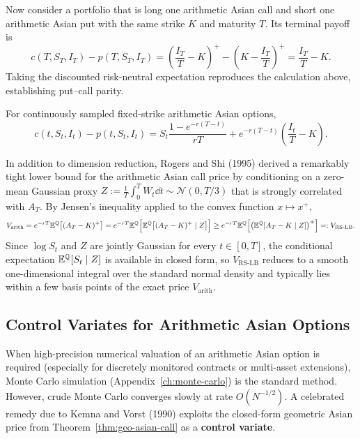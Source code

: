Now consider a portfolio that is long one arithmetic Asian call and short one arithmetic Asian put with the same strike $K$ and maturity $T$. Its terminal payoff is
\[
c(T, S_T, I_T) - p(T, S_T, I_T) = \left(\frac{I_T}{T} - K\right)^+ - \left(K - \frac{I_T}{T}\right)^+ = \frac{I_T}{T} - K.
\]
Taking the discounted risk-neutral expectation reproduces the calculation above, establishing put--call parity.

\begin{theorem}\label{thm:asian-put-call-parity}
    For continuously sampled fixed-strike arithmetic Asian options,
    \[
    c(t, S_t, I_t) - p(t, S_t, I_t) = S_t\frac{1 - e^{-r(T-t)}}{r T} + e^{-r(T-t)}\left(\frac{I_t}{T} - K\right).
    \]
\end{theorem}

In addition to dimension reduction, Rogers and Shi (1995) derived a remarkably tight lower bound for the arithmetic Asian call price by conditioning on a zero-mean Gaussian proxy $Z := \frac{1}{T}\int_0^T W_t \dd t \sim \mathcal{N}(0, T/3)$ that is strongly correlated with $A_T$. By Jensen's inequality applied to the convex function $x \mapsto x^+$,
\begin{equation}\label{eq:rogers-shi-lb}
    V_{\mathrm{arith}} = e^{-rT}\mathbb{E}^{\mathbb{Q}}\bigl[(A_T - K)^+\bigr]
    = e^{-rT}\mathbb{E}^{\mathbb{Q}}\Bigl[\mathbb{E}^{\mathbb{Q}}\bigl[(A_T - K)^+ \mid Z\bigr]\Bigr]
    \ge e^{-rT}\mathbb{E}^{\mathbb{Q}}\Bigl[\bigl(\mathbb{E}^{\mathbb{Q}}[A_T - K \mid Z]\bigr)^+\Bigr] =: V_{\mathrm{RS\text{-}LB}}.
\end{equation}
Since $\log S_t$ and $Z$ are jointly Gaussian for every $t \in [0, T]$, the conditional expectation $\mathbb{E}^{\mathbb{Q}}[S_t \mid Z]$ is available in closed form, so $V_{\mathrm{RS\text{-}LB}}$ reduces to a smooth one-dimensional integral over the standard normal density and typically lies within a few basis points of the exact price $V_{\mathrm{arith}}$.

\subsection{Control Variates for Arithmetic Asian Options}

When high-precision numerical valuation of an arithmetic Asian option is required (especially for discretely monitored contracts or multi-asset extensions), Monte Carlo simulation (Appendix~\ref{ch:monte-carlo}) is the standard method. However, crude Monte Carlo converges slowly at rate $O(N^{-1/2})$. A celebrated remedy due to Kemna and Vorst (1990) exploits the closed-form geometric Asian price from Theorem~\ref{thm:geo-asian-call} as a \textbf{control variate}.

